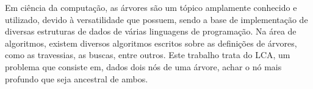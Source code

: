 \documentclass[12pt, a4paper, oneside]{article}
\newcommand{\str}[1]{\ensuremath{\mathtt{#1}}\xspace}
\newcommand{\strset}[1]{\ensuremath{\mathcal{#1}}\xspace}
\newcommand{\ssS}{\strset{S}}
\begin{document}


Em ciência da computação, as árvores são um tópico amplamente conhecido e utilizado, devido à versatilidade que possuem, sendo a base de implementação de diversas estruturas de dados de várias linguagens de programação. Na área de algoritmos, existem diversos algoritmos escritos sobre as definições de árvores, como as travessias, as buscas, entre outros. Este trabalho trata do LCA, um problema que consiste em, dados dois nós de uma árvore, achar o nó mais profundo que seja ancestral de ambos.

\end{document}

